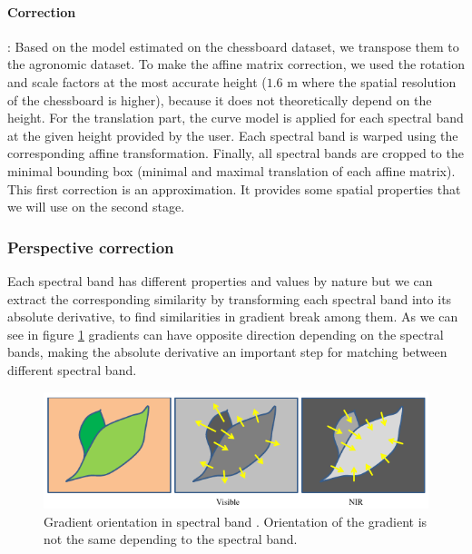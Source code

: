 \documentclass[a4paper,twoside]{article}
\begin{document}
	\paragraph{Correction} :
	Based on the model estimated on the chessboard dataset, we transpose them to the agronomic dataset.
	To make the affine matrix correction, we used the rotation and scale factors at the most accurate height
	($1.6$ m where the spatial resolution of the chessboard is higher), because it does not theoretically depend on the height.
	For the translation part, the curve model is applied for each spectral band at the given height provided by the user.
	Each spectral band is warped using the corresponding affine transformation.
	Finally, all spectral bands are cropped to the minimal bounding box (minimal and maximal translation of each affine matrix).
	This first correction is an approximation. It provides some spatial properties that we will use on the second stage.
	
	\subsubsection{Perspective correction}
	
	
	Each spectral band has different properties and values by nature
	but we can extract the corresponding similarity by transforming each spectral band into its absolute derivative,
	to find similarities in gradient break among them.
	As we can see in figure \ref{fig:vegetable-gradient}
	gradients can have opposite direction depending on the spectral bands,
	making the absolute derivative an important step for matching between different spectral band.
	
	\begin{figure}[h]
		\centering
		\includegraphics[width=\linewidth]{../figures/contrast-inversion.png}
		\caption{
			Gradient orientation in spectral band \cite{rabatel:hal-01684135}.
			Orientation of the gradient is not the same depending to the spectral band.
		}
		\label{fig:vegetable-gradient}
	\end{figure}
	
\end{document}
